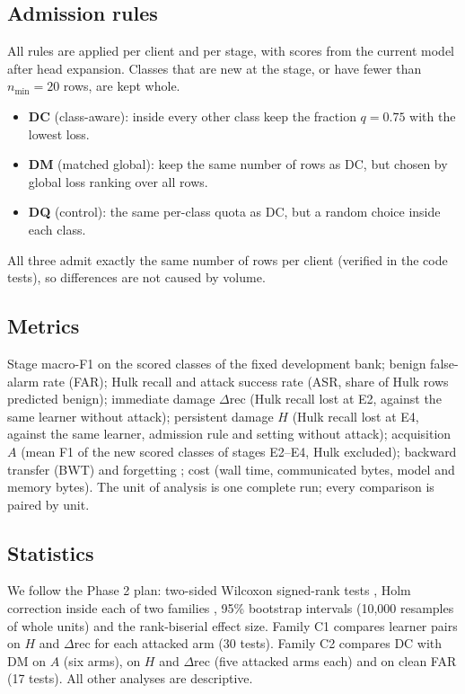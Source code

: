 \documentclass[10pt,a4paper]{article}
\begin{document}
\subsection{Admission rules}
All rules are applied per client and per stage, with scores from the current model after head expansion. Classes that are new at the stage, or have fewer than $n_{\min}=20$ rows, are kept whole.
\begin{itemize}
\item \textbf{DC} (class-aware): inside every other class keep the fraction $q=0.75$ with the lowest loss.
\item \textbf{DM} (matched global): keep the same number of rows as DC, but chosen by global loss ranking over all rows.
\item \textbf{DQ} (control): the same per-class quota as DC, but a random choice inside each class.
\end{itemize}
All three admit exactly the same number of rows per client (verified in the code tests), so differences are not caused by volume.

\subsection{Metrics}
Stage macro-F1 on the scored classes of the fixed development bank; benign false-alarm rate (FAR); Hulk recall and attack success rate (ASR, share of Hulk rows predicted benign); immediate damage $\Delta$rec (Hulk recall lost at E2, against the same learner without attack); persistent damage $H$ (Hulk recall lost at E4, against the same learner, admission rule and setting without attack); acquisition $A$ (mean F1 of the new scored classes of stages E2--E4, Hulk excluded); backward transfer (BWT) and forgetting \cite{clmetrics}; cost (wall time, communicated bytes, model and memory bytes). The unit of analysis is one complete run; every comparison is paired by unit.

\subsection{Statistics}
We follow the Phase 2 plan: two-sided Wilcoxon signed-rank tests \cite{wilcoxon}, Holm correction inside each of two families \cite{holm}, 95\% bootstrap intervals (10,000 resamples of whole units) and the rank-biserial effect size. Family C1 compares learner pairs on $H$ and $\Delta$rec for each attacked arm (30 tests). Family C2 compares DC with DM on $A$ (six arms), on $H$ and $\Delta$rec (five attacked arms each) and on clean FAR (17 tests). All other analyses are descriptive.
\end{document}

